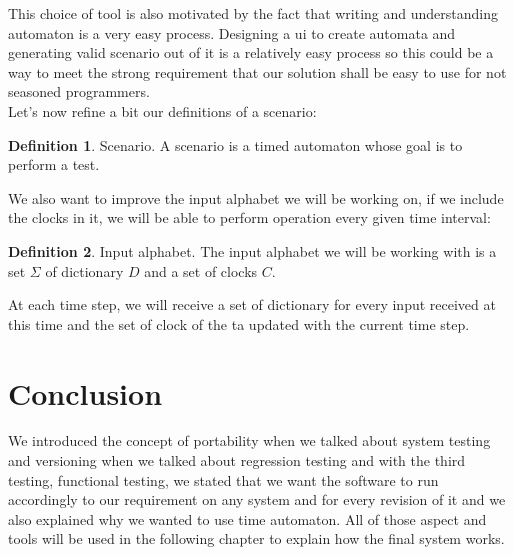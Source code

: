 \documentclass[12pt]{article}
\theoremstyle{definition}
\newtheorem{definition}{Definition}[section]
\theoremstyle{definition}
\theoremstyle{remark}
\begin{document}
This choice of tool is also motivated by the fact that writing and understanding automaton is a very easy process. Designing a \gls{ui} to create automata and generating valid scenario out of it is a relatively easy process so this could be a way to meet the strong requirement that our solution shall be easy to use for not seasoned programmers.\\

Let's now refine a bit our definitions of a scenario:
\theoremstyle{definition}
\begin{definition}{Scenario.} A scenario is a timed automaton whose goal is to perform a test.
\end{definition}

We also want to improve the input alphabet we will be working on, if we include the clocks in it, we will be able to perform operation every given time interval:
\theoremstyle{definition}
\begin{definition}{Input alphabet.} The input alphabet we will be working with is a set $\Sigma$ of dictionary $D$ and a set of clocks $C$.
\end{definition}

At each time step, we will receive a set of dictionary for every input received at this time and the set of clock of the \gls{ta} updated with the current time step.



\section{Conclusion}


We introduced the concept of portability when we talked about system testing and versioning when we talked about regression testing and with the third testing, functional testing, we stated that we want the software to run accordingly to our requirement on any system and for every revision of it and we also explained why we wanted to use time automaton. All of those aspect and tools will be used in the following chapter to explain how the final system works.

\end{document}
